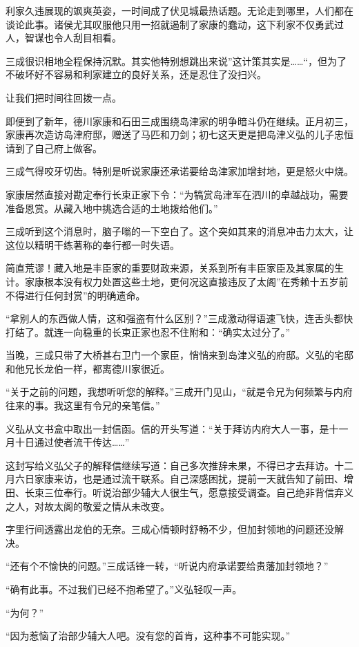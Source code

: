 \documentclass[
]{book}
\begin{document}
利家久违展现的飒爽英姿，一时间成了伏见城最热话题。无论走到哪里，人们都在谈论此事。诸侯尤其叹服他只用一招就遏制了家康的蠢动，这下利家不仅勇武过人，智谋也令人刮目相看。

三成很识相地全程保持沉默。其实他特别想跳出来说''这计策其实是\ldots\ldots``，但为了不破坏好不容易和利家建立的良好关系，还是忍住了没扫兴。

让我们把时间往回拨一点。

即便到了新年，德川家康和石田三成围绕岛津家的明争暗斗仍在继续。正月初三，家康再次造访岛津府邸，赠送了马匹和刀剑；初七这天更是把岛津义弘的儿子忠恒请到了自己府上做客。

三成气得咬牙切齿。特别是听说家康还承诺要给岛津家加增封地，更是怒火中烧。

家康居然直接对勘定奉行长束正家下令：``为犒赏岛津军在泗川的卓越战功，需要准备恩赏。从藏入地中挑选合适的土地拨给他们。''

三成听到这个消息时，脑子嗡的一下空白了。这个突如其来的消息冲击力太大，让这位以精明干练著称的奉行都一时失语。

简直荒谬！藏入地是丰臣家的重要财政来源，关系到所有丰臣家臣及其家属的生计。家康根本没有权力处置这些土地，更何况这直接违反了太阁''在秀赖十五岁前不得进行任何封赏''的明确遗命。

``拿别人的东西做人情，这和强盗有什么区别？''三成激动得语速飞快，连舌头都快打结了。就连一向稳重的长束正家也忍不住附和：``确实太过分了。''

当晚，三成只带了大桥甚右卫门一个家臣，悄悄来到岛津义弘的府邸。义弘的宅邸和他兄长龙伯一样，都离德川家很近。

``关于之前的问题，我想听听您的解释。''三成开门见山，``就是令兄为何频繁与内府往来的事。我这里有令兄的亲笔信。''

义弘从文书盒中取出一封信函。信的开头写道：``关于拜访内府大人一事，是十一月十日通过使者流干传达\ldots\ldots{}''

这封写给义弘父子的解释信继续写道：自己多次推辞未果，不得已才去拜访。十二月六日家康来访，也是通过流干联系。自己深感困扰，提前一天就告知了前田、增田、长束三位奉行。听说治部少辅大人很生气，愿意接受调查。自己绝非背信弃义之人，对故太阁的敬爱之情从未改变。

字里行间透露出龙伯的无奈。三成心情顿时舒畅不少，但加封领地的问题还没解决。

``还有个不愉快的问题。''三成话锋一转，``听说内府承诺要给贵藩加封领地？''

``确有此事。不过我们已经不抱希望了。''义弘轻叹一声。

``为何？''

``因为惹恼了治部少辅大人吧。没有您的首肯，这种事不可能实现。''
\end{document}
